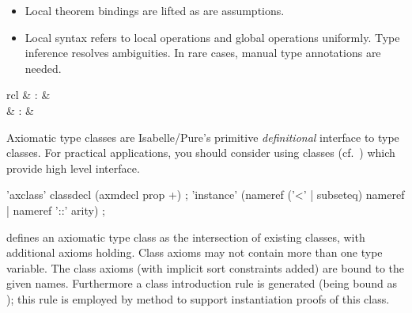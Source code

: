 \begin{isabellebody}
\begin{isamarkuptext}
\begin{itemize}
  \item Local theorem bindings are lifted as are assumptions.

  \item Local syntax refers to local operations  and
  global operations  uniformly.  Type inference
  resolves ambiguities.  In rare cases, manual type annotations are
  needed.
  
  \end{itemize}%
\end{isamarkuptext}%
\isamarkuptrue%
%
\isamarkuptrue%
%
\begin{isamarkuptext}%
\begin{matharray}{rcl}
    \mbox{} & : &  \\
    \mbox{} & : &  \\
  \end{matharray}

  Axiomatic type classes are Isabelle/Pure's primitive
  \emph{definitional} interface to type classes.  For practical
  applications, you should consider using classes
  (cf.~) which provide high level interface.

  \begin{rail}
    'axclass' classdecl (axmdecl prop +)
    ;
    'instance' (nameref ('<' | subseteq) nameref | nameref '::' arity)
    ;
  \end{rail}

  \begin{descr}
  
  \item [\mbox{\isa{\isacommand{axclass}}}~\isa{c\ {\isasymsubseteq}\ c\isactrlsub {\isadigit{1}}{\isacharcomma}\ {\isasymdots}{\isacharcomma}\ c\isactrlsub n\ axms}] defines an axiomatic type class as the intersection of
  existing classes, with additional axioms holding.  Class axioms may
  not contain more than one type variable.  The class axioms (with
  implicit sort constraints added) are bound to the given names.
  Furthermore a class introduction rule is generated (being bound as
  ); this rule is employed by method \mbox{} to support instantiation proofs of this class.
  

\end{descr}
\end{isamarkuptext}
\end{isabellebody}
